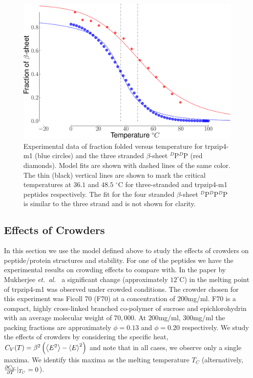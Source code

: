 \begin{figure}[ht]
 \includegraphics[width=\figurewidthSINGLE]{WL_crowding_paper/PLOT_all_experimental_fits-crop.pdf}
 \caption{Experimental data of fraction folded versus temperature for trpzip4-m1 (blue circles) and the three stranded $\beta$-sheet $^D$P$^D$P (red diamonds). Model fits are shown with dashed lines of the same color. The thin (black) vertical lines are shown to mark the critical temperatures at $36.1$ and $48.5$ $^\circ$C for three-stranded and trpzip4-m1 peptides respectively. The fit for the four stranded $\beta$-sheet $^D$P$^D$P$^D$P is similar to the three strand and is not shown for clarity.}
  \label{fig:Exp_fits}
\end{figure}

\subsection{Effects of Crowders}
In this section we use the model defined above to study the effects of crowders on peptide/protein structures and stability. For one of the peptides we have the experimental results on crowding effects to compare with. In the paper by Mukherjee \textit{et.\ al.\ }\cite{mukherjee_effect_2009} a significant change (approximately $12 ^\circ$C) in the melting point of trpzip4-m1 was observed  under crowded conditions. The crowder chosen for this experiment was Ficoll 70 (F70) at a concentration of $200$mg/ml. F70 is a compact, highly cross-linked branched co-polymer of sucrose and epichlorohydrin\cite{venturoli_ficoll_2005} with an average molecular weight of $70,000$. At $200$mg/ml, $300$mg/ml the packing fractions are approximately $\phi=0.13$ and $\phi=0.20$ respectively.\cite{lavrenko_separation_1987,dhar_structure_2010} We study the effects of crowders by considering the specific heat, $C_V(T) = \beta^2 \left(  \left<  E^2  \right> - \left< E \right>^2 \right)$ and note that in all cases, we observe only a single maxima. We identify this maxima as the melting temperature $T_C$ (alternatively, $\frac{\partial C_V}{\partial T} | _ {T_C} = 0$). 

